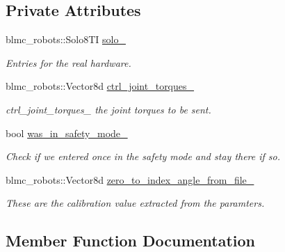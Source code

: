 \subsection*{Private Attributes}
\begin{DoxyCompactItemize}
\item 
blmc\+\_\+robots\+::\+Solo8\+TI \hyperlink{classdg__blmc__robots_1_1DGMSolo8TI_ae1fd04476b371df57db40d6a97783731}{solo\+\_\+}
\begin{DoxyCompactList}\small\item\em Entries for the real hardware. \end{DoxyCompactList}\item 
blmc\+\_\+robots\+::\+Vector8d \hyperlink{classdg__blmc__robots_1_1DGMSolo8TI_accfae6534d5201f28278eeba0febb22e}{ctrl\+\_\+joint\+\_\+torques\+\_\+}
\begin{DoxyCompactList}\small\item\em ctrl\+\_\+joint\+\_\+torques\+\_\+ the joint torques to be sent. \end{DoxyCompactList}\item 
bool \hyperlink{classdg__blmc__robots_1_1DGMSolo8TI_a2f99efb27e8260c0f900a96e67e810db}{was\+\_\+in\+\_\+safety\+\_\+mode\+\_\+}\hypertarget{classdg__blmc__robots_1_1DGMSolo8TI_a2f99efb27e8260c0f900a96e67e810db}{}\label{classdg__blmc__robots_1_1DGMSolo8TI_a2f99efb27e8260c0f900a96e67e810db}

\begin{DoxyCompactList}\small\item\em Check if we entered once in the safety mode and stay there if so. \end{DoxyCompactList}\item 
blmc\+\_\+robots\+::\+Vector8d \hyperlink{classdg__blmc__robots_1_1DGMSolo8TI_a05609f544243050ecac91ec55c9d7066}{zero\+\_\+to\+\_\+index\+\_\+angle\+\_\+from\+\_\+file\+\_\+}
\begin{DoxyCompactList}\small\item\em These are the calibration value extracted from the paramters. \end{DoxyCompactList}\end{DoxyCompactItemize}


\subsection{Member Function Documentation}
